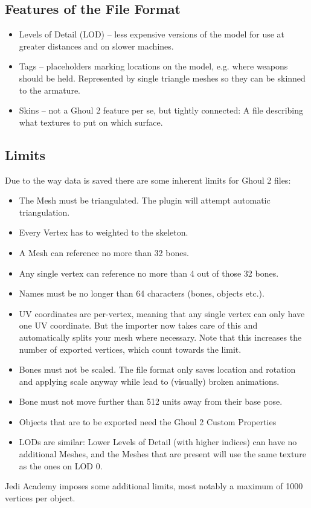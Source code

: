 \documentclass[a4paper,10pt]{article}
\begin{document}
 
 \subsection{Features of the File Format}
 \begin{itemize}
  \item Levels of Detail (LOD) -- less expensive versions of the model for use at greater distances and on
  slower machines.
  \item Tags -- placeholders marking locations on the model, e.g. where weapons should be held. Represented by
  single triangle meshes so they can be skinned to the armature.
  \item Skins -- not a Ghoul 2 feature per se, but tightly connected: A file describing what textures to put on
  which surface.
 \end{itemize}
 
 
 \subsection{Limits}
 
 Due to the way data is saved there are some inherent limits for Ghoul 2 files:
 \begin{itemize}
  \item The Mesh must be triangulated. The plugin will attempt automatic triangulation.
  \item Every Vertex has to weighted to the skeleton.
  \item A Mesh can reference no more than 32 bones.
  \item Any single vertex can reference no more than 4 out of those 32 bones.
  \item Names must be no longer than 64 characters (bones, objects etc.).
  \item UV coordinates are per-vertex, meaning that any single vertex can only have one UV coordinate.
  But the importer now takes care of this and automatically splits your mesh where necessary.
  Note that this increases the number of exported vertices, which count towards the limit.
  \item Bones must not be scaled. The file format only saves location and rotation and applying scale anyway
  while lead to (visually) broken animations.
  \item Bone must not move further than 512 units away from their base pose.
  \item Objects that are to be exported need the Ghoul 2 Custom Properties
  \item LODs are similar: Lower Levels of Detail (with higher indices) can have no additional Meshes, and the
  Meshes that are present will use the same texture as the ones on LOD 0.
 \end{itemize}
 Jedi Academy imposes some additional limits, most notably a maximum of 1000 vertices per object.
 
\end{document}
